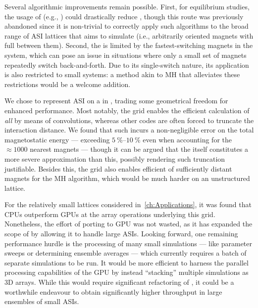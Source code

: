 Several algorithmic improvements remain possible.
First, for equilibrium studies, the usage of  (e.g., ) could drastically reduce , though this route was previously abandoned since it is non-trivial to correctly apply such algorithms to the broad range of ASI lattices that \hotspice aims to simulate (i.e., arbitrarily oriented magnets with full  between them).
Second, the  is limited by the fastest-switching magnets in the system, which can pose an issue in situations where only a small set of magnets repeatedly switch back-and-forth.
Due to its single-switch nature, its application is also restricted to small systems: a method akin to MH  that alleviates these restrictions would be a welcome addition. \par
We chose to represent ASI on a  in \hotspice, trading some geometrical freedom for enhanced performance. %
Most notably, the grid enables the efficient calculation of \textit{all}  by means of convolutions, whereas other codes are often forced to truncate the interaction distance.
We found that such  incurs a non-negligible error on the total magnetostatic energy --- exceeding $\SIrange{5}{10}{\percent}$ even when accounting for the $\approx 1000$ nearest magnets --- though it can be argued that the  itself constitutes a more severe approximation than this, possibly rendering such truncation justifiable.
Besides this, the grid also enables efficient  of sufficiently distant magnets for the MH algorithm, which would be much harder on an unstructured lattice. \par
For the relatively small lattices considered in~\cref{ch:Applications}, it was found that CPUs outperform GPUs at the array operations underlying this grid. %
Nonetheless, the effort of porting \hotspice to GPU was not wasted, as it has expanded the scope of \hotspice by allowing it to handle large ASIs.
Looking forward, one remaining performance hurdle is the processing of many small simulations --- like parameter sweeps or determining ensemble averages --- which currently requires a batch of separate simulations to be run.
It would be more efficient to harness the parallel processing capabilities of the GPU by instead ``stacking'' multiple simulations as 3D arrays.
While this would require significant refactoring of \hotspice, it could be a worthwhile endeavour to obtain significantly higher throughput in large ensembles of small ASIs.

